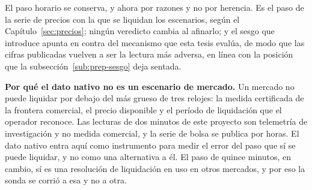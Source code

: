 El paso horario se conserva, y ahora por razones y no por herencia. Es el
paso de la serie de precios con la que se liquidan los escenarios, según el
Capítulo~\ref{sec:precios}; ningún veredicto cambia al afinarlo; y el sesgo
que introduce apunta en contra del mecanismo que esta tesis evalúa, de modo
que las cifras publicadas vuelven a ser la lectura más adversa, en línea
con la posición que la subsección~\ref{sub:prep-sesgo} deja sentada.

\begin{detallebox}
\textbf{Por qué el dato nativo no es un escenario de mercado.} Un mercado no
puede liquidar por debajo del más grueso de tres relojes: la medida
certificada de la frontera comercial, el precio disponible y el período de
liquidación que el operador reconoce. Las lecturas de dos minutos de este
proyecto son telemetría de investigación y no medida comercial, y la serie
de bolsa se publica por horas. El dato nativo entra aquí como instrumento
para medir el error del paso que sí se puede liquidar, y no como una
alternativa a él. El paso de quince minutos, en cambio, sí es una
resolución de liquidación en uso en otros mercados, y por eso la sonda se
corrió a esa y no a otra.
\end{detallebox}

